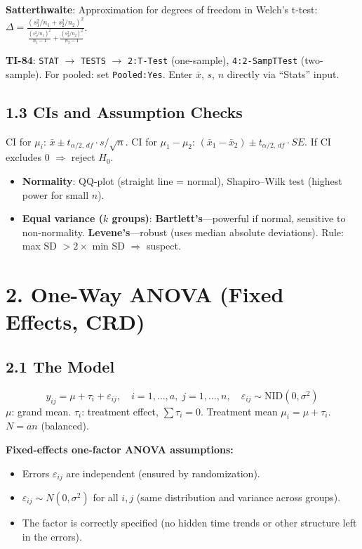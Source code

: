 \documentclass[9pt,letterpaper]{article}
\begin{document}
\textbf{Satterthwaite}: Approximation for degrees of freedom in Welch's t-test: $\Delta = \frac{(s_1^2/n_1 + s_2^2/n_2)^2}{\frac{(s_1^2/n_1)^2}{n_1-1} + \frac{(s_2^2/n_2)^2}{n_2-1}}$.

\begin{calcbox}
\textbf{TI-84}: \texttt{STAT} $\to$ \texttt{TESTS} $\to$ \texttt{2:T-Test} (one-sample), \texttt{4:2-SampTTest} (two-sample). For pooled: set \texttt{Pooled:Yes}. Enter $\bar{x}$, $s$, $n$ directly via ``Stats'' input.
\end{calcbox}

\subsection{1.3 CIs and Assumption Checks}

CI for $\mu_i$: $\bar{x} \pm t_{\alpha/2,\,df}\cdot s/\sqrt{n}$. CI for $\mu_1 - \mu_2$: $(\bar{x}_1 - \bar{x}_2) \pm t_{\alpha/2,\,df}\cdot SE$. If CI excludes 0 $\Rightarrow$ reject $H_0$.

\begin{itemize}
    \item \textbf{Normality}: QQ-plot (straight line = normal), Shapiro--Wilk test (highest power for small $n$).
    \item \textbf{Equal variance ($k$ groups)}: \textbf{Bartlett's}---powerful if normal, sensitive to non-normality. \textbf{Levene's}---robust (uses median absolute deviations). Rule: max SD $> 2\times$ min SD $\Rightarrow$ suspect.
\end{itemize}

\section{2. One-Way ANOVA (Fixed Effects, CRD)}

\subsection{2.1 The Model}
\[
y_{ij} = \mu + \tau_i + \varepsilon_{ij}, \quad i=1,\ldots,a,\; j=1,\ldots,n, \quad \varepsilon_{ij}\sim \text{NID}(0,\sigma^2)
\]
$\mu$: grand mean. $\tau_i$: treatment effect, $\sum\tau_i=0$. Treatment mean $\mu_i=\mu+\tau_i$. $N=an$ (balanced).

\textbf{Fixed-effects one-factor ANOVA assumptions:}
\begin{itemize}
  \item Errors $\varepsilon_{ij}$ are independent (ensured by randomization).
  \item $\varepsilon_{ij}\sim N(0,\sigma^2)$ for all $i,j$ (same distribution and variance across groups).
  \item The factor is correctly specified (no hidden time trends or other structure left in the errors).
\end{itemize}
\end{document}
